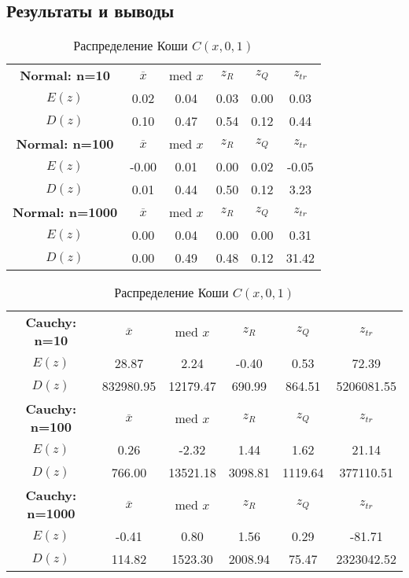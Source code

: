 \documentclass[14pt]{extarticle}
\begin{document}
\subsection{Результаты и выводы}

\begin{table}[htbp]
    \centering
    \begin{tabular}{|c|c|c|c|c|c|}
        \toprule
        \textbf{Normal: n=10} & \(\overline{x}\) & med \(x\) & \(z_R\) & \(z_Q\) & \(z_{tr}\)\\
        \(E(z)\) & 0.02 & 0.04 & 0.03 & 0.00 & 0.03  \\
        \(D(z)\) & 0.10 & 0.47 & 0.54 & 0.12 & 0.44 \\
        \midrule
  	\textbf{Normal: n=100} & \(\overline{x}\) & med \(x\) & \(z_R\) & \(z_Q\) & \(z_{tr}\)\\
        \(E(z)\) & -0.00 & 0.01 & 0.00 & 0.02 & -0.05   \\
        \(D(z)\) & 0.01 & 0.44 & 0.50 & 0.12 & 3.23 \\
        \midrule
	\textbf{Normal: n=1000} & \(\overline{x}\) & med \(x\) & \(z_R\) & \(z_Q\) & \(z_{tr}\)\\
        \(E(z)\) & 0.00 & 0.04 & 0.00 & 0.00 & 0.31   \\
        \(D(z)\) &  0.00 & 0.49 & 0.48 & 0.12 & 31.42 \\
        \toprule
    \end{tabular}
    \caption{Распределение Коши \(C(x, 0, 1)\)}
    \label{tab:cauchy_t}
\end{table}

\begin{table}[htbp]
    \centering
    \begin{tabular}{|c|c|c|c|c|c|}
        \toprule
        \textbf{Cauchy: n=10} & \(\overline{x}\) & med \(x\) & \(z_R\) & \(z_Q\) & \(z_{tr}\)\\
        \(E(z)\) & 28.87 & 2.24 & -0.40 & 0.53 & 72.39  \\
        \(D(z)\) & 832980.95 & 12179.47 & 690.99 & 864.51 & 5206081.55 \\
        \midrule
  	\textbf{Cauchy: n=100} & \(\overline{x}\) & med \(x\) & \(z_R\) & \(z_Q\) & \(z_{tr}\)\\
        \(E(z)\) & 0.26 & -2.32 & 1.44 & 1.62 & 21.14    \\
        \(D(z)\) & 766.00 & 13521.18 & 3098.81 & 1119.64 & 377110.51 \\
        \midrule
	\textbf{Cauchy: n=1000} & \(\overline{x}\) & med \(x\) & \(z_R\) & \(z_Q\) & \(z_{tr}\)\\
        \(E(z)\) & -0.41 & 0.80 & 1.56 & 0.29 & -81.71    \\
        \(D(z)\) & 114.82 & 1523.30 & 2008.94 & 75.47 & 2323042.52 \\
        \toprule
    \end{tabular}
    \caption{Распределение Коши \(C(x, 0, 1)\)}
    \label{tab:cauchy_t}
\end{table}
\end{document}
